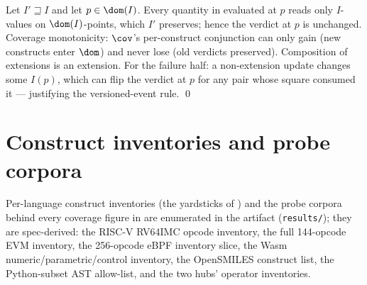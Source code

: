Let $I' \sqsupseteq I$ and let $p \in \dom(I)$. Every quantity in
 evaluated at $p$ reads only $I$-values on
$\dom(I)$-points, which $I'$ preserves; hence the verdict at $p$ is
unchanged. Coverage monotonicity: $\cov$'s per-construct conjunction can
only gain (new constructs enter $\dom$) and never lose (old verdicts
preserved). Composition of extensions is an extension. For the failure
half: a non-extension update changes some $I(p)$, which can flip the
verdict at $p$ for any pair whose square consumed it --- justifying
the versioned-event rule. \qed

\section{Construct inventories and probe corpora}
\label{app:inventories}

Per-language construct inventories (the yardsticks of
) and the probe corpora behind every coverage figure
in  are enumerated in the artifact
(\texttt{results/}); they are spec-derived: the RISC-V RV64IMC opcode
inventory, the full 144-opcode EVM inventory, the 256-opcode eBPF
inventory slice, the Wasm numeric/parametric/control inventory, the
OpenSMILES construct list, the Python-subset AST allow-list, and the
two hubs' operator inventories.
